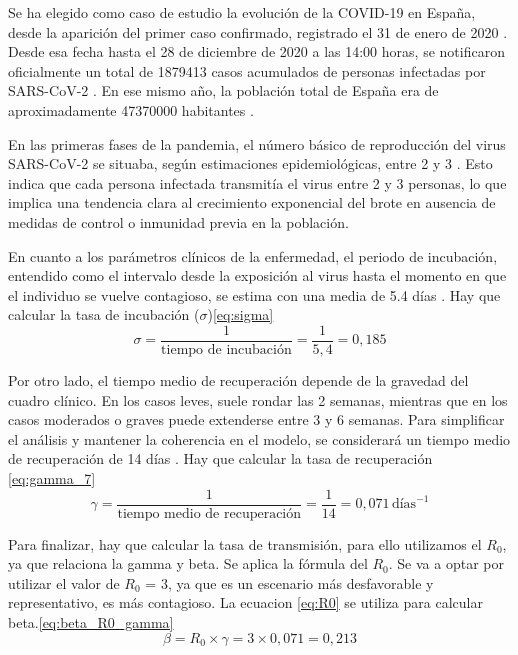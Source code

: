 Se ha elegido como caso de estudio la evolución de la COVID-19 en España, desde la aparición del primer caso confirmado, registrado el 31 de enero de 2020 \cite{primer_caso_covid_espana}. Desde esa fecha hasta el 28 de diciembre de 2020 a las 14:00 horas, se notificaron oficialmente un total de 1879413 casos acumulados de personas infectadas por SARS-CoV-2 \cite{sanidad_covid_situacion}. En ese mismo año, la población total de España era de aproximadamente 47370000 habitantes \cite{datacommons_espana_demografia}.

En las primeras fases de la pandemia, el número básico de reproducción del virus SARS-CoV-2 se situaba, según estimaciones epidemiológicas, entre 2 y 3 \cite{garcia_r0_desescalada}. Esto indica que cada persona infectada transmitía el virus entre 2 y 3 personas, lo que implica una tendencia clara al crecimiento exponencial del brote en ausencia de medidas de control o inmunidad previa en la población.

En cuanto a los parámetros clínicos de la enfermedad, el periodo de incubación, entendido como el intervalo desde la exposición al virus hasta el momento en que el individuo se vuelve contagioso, se estima con una media de 5.4 días \cite{lauer2020incubation}. Hay que calcular la tasa de incubación ($\sigma$)\eqref{eq:sigma}
\begin{equation}
\sigma = \frac{1}{\text{tiempo de incubación}} = \frac{1}{5{,}4} = 0{,}185
\label{eq:sigma}
\end{equation}

Por otro lado, el tiempo medio de recuperación depende de la gravedad del cuadro clínico. En los casos leves, suele rondar las 2 semanas, mientras que en los casos moderados o graves puede extenderse entre 3 y 6 semanas. Para simplificar el análisis y mantener la coherencia en el modelo, se considerará un tiempo medio de recuperación de 14 días \cite{ada_duracion_covid}. Hay que calcular la tasa de recuperación \eqref{eq:gamma_7}
\begin{equation}
\gamma = \frac{1}{\text{tiempo medio de recuperación}} = \frac{1}{14} = 0{,}071 \,\text{días}^{-1}
\label{eq:gamma_7}
\end{equation}

Para finalizar, hay que calcular la tasa de transmisión, para ello utilizamos el $R_0$, ya que relaciona la gamma y beta. Se aplica la fórmula del $R_0$. Se va a optar por utilizar el valor de $R_0$ = 3, ya que es un escenario más desfavorable y representativo, es más contagioso. La ecuacion \eqref{eq:R0} se utiliza para calcular beta.\eqref{eq:beta_R0_gamma}
\begin{equation}
\beta = R_0 \times \gamma = 3 \times 0{,}071 = 0{,}213
\label{eq:beta_R0_gamma}
\end{equation}

